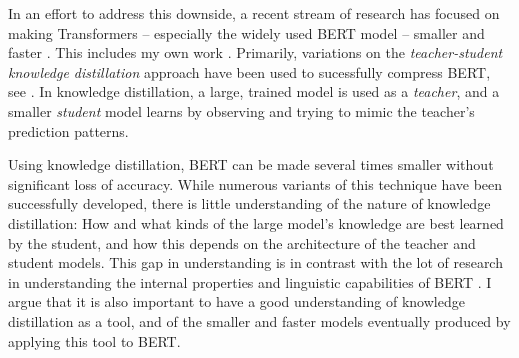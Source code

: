 \documentclass[bsc,frontabs,singlespacing,parskip,deptreport]{infthesis}
\begin{document}
{{    %
    In an effort to address this downside, a recent stream of research has focused on making Transformers -- especially the widely used BERT model \citep{Devlin_2018} -- smaller and faster \citep{Michel_2019,Cheong_2019}. This includes my own work \citep{Sucik_2019}.
    Primarily, variations on the \textit{teacher-student knowledge distillation} approach \citep{Bucila_2006} have been used to sucessfully compress BERT, see \citet{Sun_2019a,Mukherjee_2019,Tang_2019a,Tang_2019b,Jiao_2019,Sanh_2019}.
    In knowledge distillation, a large, trained model is used as a \textit{teacher}, and a smaller \textit{student} model learns by observing and trying to mimic the teacher's prediction patterns.
    
    
    Using knowledge distillation, BERT can be made several times smaller without significant loss of accuracy.
    While numerous variants of this technique have been successfully developed, there is little understanding of the nature of knowledge distillation: 
    How and what kinds of the large model's knowledge are best learned by the student, and how this depends on the architecture of the teacher and student models.
    This gap in understanding is in contrast with the lot of research in understanding the internal properties and linguistic capabilities of BERT \citep{Ganesh_2019,Tenney_2019b,Kovaleva_2019,Lin_2019}.
    I argue that it is also important to have a good understanding of knowledge distillation as a tool, and of the smaller and faster models eventually produced by applying this tool to BERT.
        
  }
  
}
\end{document}
